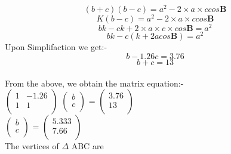 \documentclass[10pt,a4paper]{report}
\let\vec\mathbf
\begin{document}
\begin{multicols}{2}
\begin{equation}
(b+c)(b-c) = {a}^2- 2 \times a \times ccos\vec{B}
\end{equation}
\begin{equation}
K(b-c) = {a}^2- 2 \times a \times ccos\vec{B}
\end{equation}
\begin{equation}
bk-ck+2\times a\times c\times cos\vec{B} = a^2
\end{equation}
\begin{equation}
bk-c(k+2acos\vec{B})=a^2
\end{equation}
Upon Simplifaction we get:- \\
\begin{equation}
  b-1.26c = 3.76
\end{equation}
\begin{equation}
        b+c=13 
\end{equation}\\
     From the above, we obtain the matrix equation:- \\ \vspace{3mm}
        $\begin{pmatrix}
            1 & -1.26 \\
            1 & 1  \\
        \end{pmatrix}$%
        $\begin{pmatrix}
            b \\
            c \\
        \end{pmatrix}$%
           =
           $\begin{pmatrix}
            3.76\\
            13\\
        \end{pmatrix}$%
        \vspace{5mm}           
   \\  
      $\begin{pmatrix}
            b\\
            c\\
        \end{pmatrix}$%
            =
            $\begin{pmatrix}
            5.333\\
            7.66\\
        \end{pmatrix}$%
        \vspace{3mm}
   \\  The vertices of $\Delta$ ABC are \\ \vspace{3mm}

\end{multicols}
\end{document}
